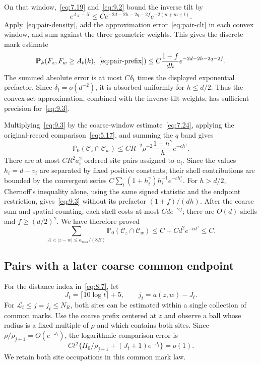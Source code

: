 \documentclass[11pt,a4paper]{article}
\numberwithin{equation}{section}
\theoremstyle{remark}
\begin{document}
On that window,~\eqref{eq:7.19} and~\eqref{eq:9.2} bound the inverse tilt by
\[
 e^{\Lambda_X-X}\le
 C e^{-2d-2h-2q-2f}e^{-2(n+m+l)}.
\]
Apply~\eqref{eq:pair-density}, add the approximation error~\eqref{eq:pair-clt} in each convex window, and sum against the three geometric weights. This gives the discrete mark estimate
\begin{equation}\label{eq:9.3}
 \mathbf P_k(F_z,F_w\ge A_t(k),\ \eqref{eq:pair-prefix})
 \le C\frac{1+f}{dh}e^{-2d-2h-2q-2f}.
\end{equation}
The summed absolute error is at most $C\delta_t$ times the displayed exponential prefactor. Since $\delta_t=o(d^{-2})$, it is absorbed uniformly for $h\le d/2$. Thus the convex-set approximation, combined with the inverse-tilt weights, has sufficient precision for~\eqref{eq:9.3}.

Multiplying~\eqref{eq:9.3} by the coarse-window estimate~\eqref{eq:7.24}, applying the original-record comparison~\eqref{eq:5.17}, and summing the $q$ band gives
\begin{equation}\label{eq:9.4}
 \mathbb P_0(\mathcal C_z\cap\mathcal C_w)
 \le CR^{-2}\rho^{-2}\frac{1+h^\gamma}{h}e^{-c h^\gamma}.
\end{equation}
There are at most $CR^2a_i^2$ ordered site pairs assigned to $a_i$. Since the values $h_i=d-v_i$ are separated by fixed positive constants, their shell contributions are bounded by the convergent series
$C\sum_i(1+h_i^\gamma)h_i^{-1}e^{-c h_i^\gamma}$.
For $h>d/2$, Chernoff's inequality alone, using the same signed statistic and the endpoint restriction, gives~\eqref{eq:9.3} without its prefactor $(1+f)/(dh)$. After the coarse sum and spatial counting, each shell costs at most $Cd e^{-2f}$; there are $O(d)$ shells and $f\ge(d/2)^\gamma$. We have therefore proved
\begin{equation}\label{eq:9.5}
 \sum_{A<|z-w|\le a_{\max}/(8B)}
 \mathbb P_0(\mathcal C_z\cap\mathcal C_w)
 \le C+Cd^2e^{-c d^\gamma}\le C.
\end{equation}

\subsection{Pairs with a later coarse common endpoint}\label{sec:coarsepairs}
For the distance index in~\eqref{eq:8.7}, let
\begin{equation}\label{eq:9.6}
J_t=\lceil10\log t\rceil+5,\qquad j_t=a(z,w)-J_t.
\end{equation}
For $\mathcal L_t\le j=j_t\le N_R$, both sites can be estimated within a single collection of common marks. Use the coarse prefix centered at $z$ and observe a ball whose radius is a fixed multiple of $\rho$ and which contains both sites. Since $\rho/\rho_{j+1}=O(e^{-J_t})$, the logarithmic comparison error is
\begin{equation}\label{eq:9.7}
Ct^2\{H_0/\rho_{j+1}+(J_t+1)e^{-J_t}\}=o(1).
\end{equation}
We retain both site occupations in this common mark law.
\end{document}
